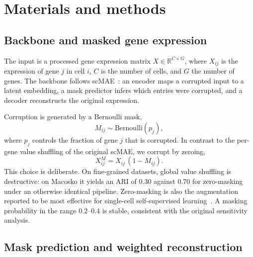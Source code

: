 \section{Materials and methods}

\subsection{Backbone and masked gene expression}

The input is a processed gene expression matrix $X \in \mathbb{R}^{C \times G}$, where
$X_{ij}$ is the expression of gene $j$ in cell $i$, $C$ is the number of cells, and $G$
the number of genes. The backbone follows scMAE~\citep{scmae2024}: an encoder maps a
corrupted input to a latent embedding, a mask predictor infers which entries were
corrupted, and a decoder reconstructs the original expression.

Corruption is generated by a Bernoulli mask,
\begin{equation}
M_{ij} \sim \mathrm{Bernoulli}(p_j),
\end{equation}
where $p_j$ controls the fraction of gene $j$ that is corrupted. In contrast to the
per-gene value shuffling of the original scMAE, we corrupt by zeroing,
\begin{equation}
X^{M}_{ij} = X_{ij}\,(1 - M_{ij}).
\end{equation}
This choice is deliberate. On fine-grained datasets, global value shuffling is
destructive: on Macosko it yields an ARI of $0.30$ against $0.70$ for zero-masking under
an otherwise identical pipeline. Zero-masking is also the augmentation reported to be
most effective for single-cell self-supervised learning~\citep{scsslbench2025}. A masking
probability in the range $0.2$--$0.4$ is stable, consistent with the original
sensitivity analysis.

\subsection{Mask prediction and weighted reconstruction}

